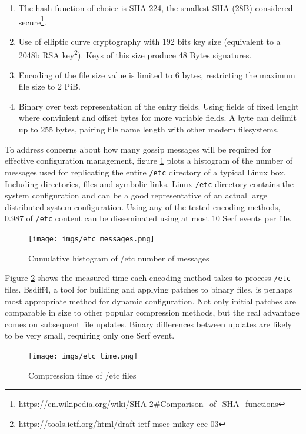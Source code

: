 \documentclass{sig-alternate}
\begin{document}
\begin{enumerate}
\item The hash function of choice is SHA-224, the smallest SHA (28B) considered secure\footnote{\url{https://en.wikipedia.org/wiki/SHA-2\#Comparison\_of\_SHA\_functions}}.
\item Use of elliptic curve cryptography with 192 bits key size (equivalent to a 2048b RSA key\footnote{\url{https://tools.ietf.org/html/draft-ietf-msec-mikey-ecc-03}}). Keys of this size produce 48 Bytes signatures.
\item Encoding of the file size value is limited to 6 bytes, restricting the maximum file size to 2 PiB.
\item Binary over text representation of the entry fields. Using fields of fixed lenght where convinient and offset bytes for more variable fields. A byte can delimit up to 255 bytes, pairing file name length with other modern filesystems.
\end{enumerate}

To address concerns about how many gossip messages will be required for effective configuration management, figure \ref{fig:etc-messages} plots a histogram of the number of messages used for replicating the entire \texttt{/etc} directory of a typical Linux box. Including directories, files and symbolic links. Linux \texttt{/etc} directory contains the system configuration and can be a good representative of an actual large distributed system configuration. Using any of the tested encoding methods, 0.987 of \texttt{/etc} content can be disseminated using at most 10 Serf events per file.

\begin{figure}
\centering
\texttt{[image: imgs/etc\_messages.png]}
\caption{Cumulative histogram of /etc number of messages}
\label{fig:etc-messages}
\end{figure}

Figure \ref{fig:etc-time} shows the measured time each encoding method takes to process \texttt{/etc} files. Bsdiff4, a tool for building and applying patches to binary files, is perhaps most appropriate method for dynamic configuration. Not only initial patches are comparable in size to other popular compression methods, but the real advantage comes on subsequent file updates. Binary differences between updates are likely to be very small, requiring only one Serf event.

\begin{figure}
\centering
\texttt{[image: imgs/etc\_time.png]}
\caption{Compression time of /etc files}
\label{fig:etc-time}
\end{figure}
\end{document}
